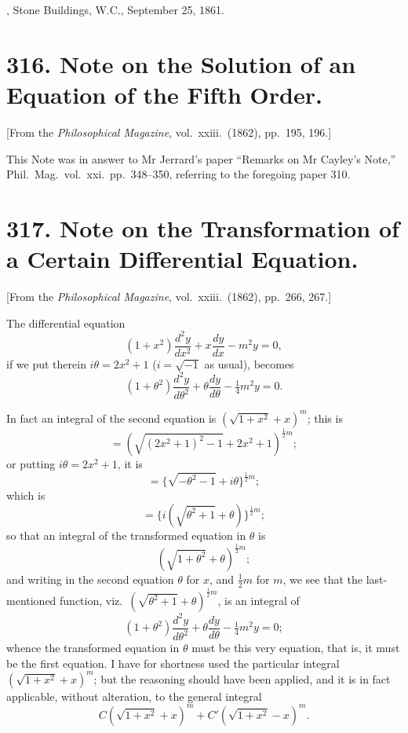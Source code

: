 \documentclass[11pt,a4paper]{article}
\theoremstyle{plain}
\begin{document}
\medskip
{}, Stone Buildings, W.C., September 25, 1861.


\newpage
\section*{316. Note on the Solution of an Equation of the Fifth Order.}

[From the \textit{Philosophical Magazine}, vol.\ xxiii.\ (1862), pp.\ 195, 196.]

\medskip

This Note was in answer to Mr Jerrard's paper ``Remarks on Mr Cayley's Note,'' Phil.\ Mag.\ vol.\ xxi.\ pp.\ 348--350, referring to the foregoing paper 310.


\newpage
\section*{317. Note on the Transformation of a Certain Differential Equation.}

[From the \textit{Philosophical Magazine}, vol.\ xxiii.\ (1862), pp.\ 266, 267.]

\medskip

The differential equation
\[
(1 + x^2)\frac{d^2y}{dx^2} + x\frac{dy}{dx} - m^2 y = 0,
\]
if we put therein $i\theta = 2x^2 + 1$ ($i = \sqrt{-1}$ as usual), becomes
\[
(1 + \theta^2)\frac{d^2y}{d\theta^2} + \theta\frac{dy}{d\theta} - \tfrac{1}{4}m^2 y = 0.
\]

In fact an integral of the second equation is $(\sqrt{1+x^2} + x)^m$; this is
\[
= (\sqrt{(2x^2+1)^2 - 1} + 2x^2 + 1)^{\frac{1}{2}m};
\]
or putting $i\theta = 2x^2 + 1$, it is
\[
= \{\sqrt{-\theta^2 - 1} + i\theta\}^{\frac{1}{2}m};
\]
which is
\[
= \{i(\sqrt{\theta^2 + 1} + \theta)\}^{\frac{1}{2}m};
\]
so that an integral of the transformed equation in $\theta$ is
\[
(\sqrt{1+\theta^2} + \theta)^{\frac{1}{2}m};
\]
and writing in the second equation $\theta$ for $x$, and $\frac{1}{2}m$ for $m$, we see that the last-mentioned function, viz.\ $(\sqrt{\theta^2+1} + \theta)^{\frac{1}{2}m}$, is an integral of
\[
(1 + \theta^2)\frac{d^2y}{d\theta^2} + \theta\frac{dy}{d\theta} - \tfrac{1}{4}m^2 y = 0;
\]
\newpage
whence the transformed equation in $\theta$ must be this very equation, that is, it must be the first equation. I have for shortness used the particular integral $(\sqrt{1+x^2} + x)^m$; but the reasoning should have been applied, and it is in fact applicable, without alteration, to the general integral
\[
C(\sqrt{1+x^2} + x)^m + C'(\sqrt{1+x^2} - x)^m.
\]
\end{document}
